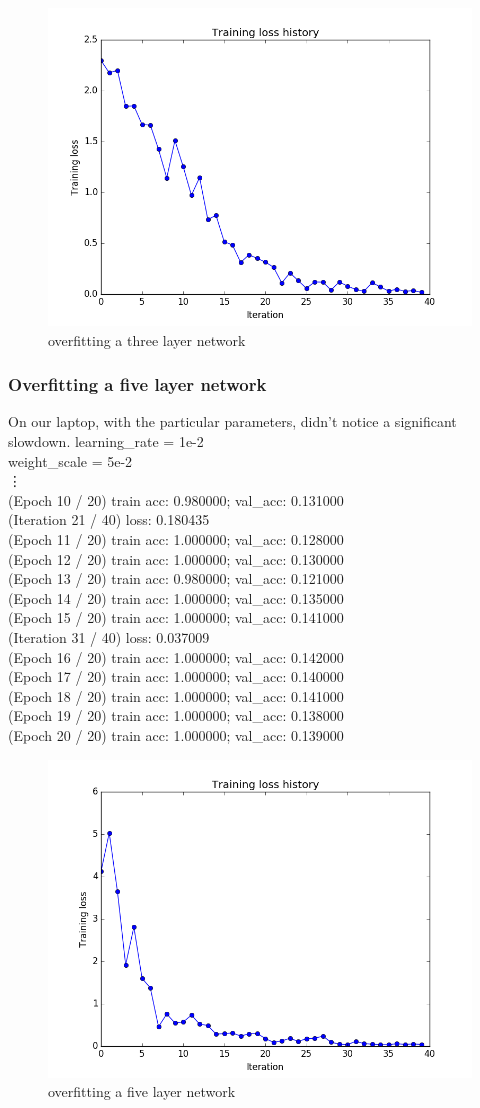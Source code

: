 \documentclass{article}
\begin{document}
\begin{figure}[H]
\centering
\includegraphics[width=0.5\linewidth]{./figure_3_1_8}
\caption{overfitting a three layer network}
\label{fig:3_1_8}
\end{figure}

\subsubsection{Overfitting a five layer network}
On our laptop, with the particular parameters, didn't notice a significant slowdown.
{\footnotesize
learning\_rate = 1e-2\\
weight\_scale = 5e-2\\
\vdots\\
(Epoch 10 / 20) train acc: 0.980000; val\_acc: 0.131000\\
(Iteration 21 / 40) loss: 0.180435\\
(Epoch 11 / 20) train acc: 1.000000; val\_acc: 0.128000\\
(Epoch 12 / 20) train acc: 1.000000; val\_acc: 0.130000\\
(Epoch 13 / 20) train acc: 0.980000; val\_acc: 0.121000\\
(Epoch 14 / 20) train acc: 1.000000; val\_acc: 0.135000\\
(Epoch 15 / 20) train acc: 1.000000; val\_acc: 0.141000\\
(Iteration 31 / 40) loss: 0.037009\\
(Epoch 16 / 20) train acc: 1.000000; val\_acc: 0.142000\\
(Epoch 17 / 20) train acc: 1.000000; val\_acc: 0.140000\\
(Epoch 18 / 20) train acc: 1.000000; val\_acc: 0.141000\\
(Epoch 19 / 20) train acc: 1.000000; val\_acc: 0.138000\\
(Epoch 20 / 20) train acc: 1.000000; val\_acc: 0.139000\\
}

\begin{figure}[H]
\centering
\includegraphics[width=0.5\linewidth]{./figure_3_1_9}
\caption{overfitting a five layer network}
\label{fig:3_1_9}
\end{figure}
\end{document}
